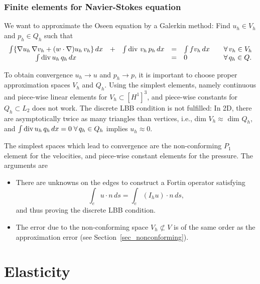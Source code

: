 \subsubsection{Finite elements for Navier-Stokes equation}

We want to approximate the Oseen equation by a Galerkin method: Find $u_h \in V_h$ and
$p_h \in Q_h$ such that
\begin{equation} \label{equ_weakoseenfem}
\begin{array}{ccccll}
\int \{ \nabla u_h \, \nabla v_h + (w\cdot \nabla) u_h \, v_h \} \, dx & + & \int \operatorname{div} \, v_h \, p_h \, dx & = & \int f v_h \, dx \quad  & \forall \, v_h \in V_h \\
\int \operatorname{div} u_h \, q_h \, dx & & & = & 0  & \forall \, q_h \in Q.
\end{array}
\end{equation}

To obtain convergence $u_h \rightarrow u$ and $p_h \rightarrow p$, it is important
to choose proper approximation spaces $V_h$ and $Q_h$. Using the simplest elements,
namely continuous and piece-wise linear elements for $V_h \subset [H^1]^3$, and piece-wise 
constants
for $Q_h \subset L_2$ does not work. The discrete LBB condition is not fulfilled:
In 2D, there are asymptotically twice as many triangles than vertices, i.e.,
dim $V_h \approx$ dim $Q_h$, and $\int \operatorname{div} u_h \, q_h \,dx = 0 \; \forall \, q_h \in Q_h$ implies $u_h \approx 0$.

\bigskip

The simplest spaces which lead to convergence are the non-conforming $P_1$ element 
for the velocities, and piece-wise constant elements for the pressure. The arguments are
\begin{itemize}
\item
There are unknowns on the edges to construct a Fortin operator satisfying
$$
\int_e u \cdot n \, ds = \int_e  (I_h u) \cdot n \, ds,
$$
and thus proving the discrete LBB condition.
\item
The error due to the non-conforming space $V_h \not\subset V$ is of the same
order as the approximation error (see Section~\ref{sec_nonconforming}).
\end{itemize}



\section{Elasticity}

